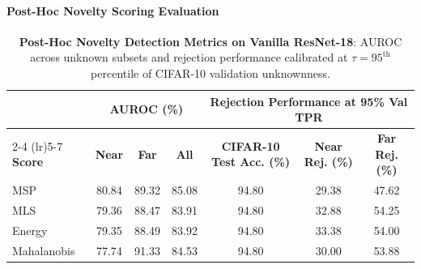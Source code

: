 \documentclass{article}
\begin{document}
\paragraph{Post-Hoc Novelty Scoring Evaluation}
\begin{table}[H]
    \centering
    \caption{\textbf{Post-Hoc Novelty Detection Metrics on Vanilla ResNet-18}: AUROC across unknown subsets and rejection performance calibrated at $\tau = 95^{\text{th}}$ percentile of CIFAR-10 validation unknownness.}
    \label{tab:task4_posthoc_scores}
    \begin{tabular}{lcccccc}
        \toprule
        & \multicolumn{3}{c}{\textbf{AUROC (\%)}} & \multicolumn{3}{c}{\textbf{Rejection Performance at 95\% Val TPR}} \\
        \cmidrule(lr){2-4} \cmidrule(lr){5-7}
        \textbf{Score} & \textbf{Near} & \textbf{Far} & \textbf{All} & \textbf{CIFAR-10 Test Acc. (\%)} & \textbf{Near Rej. (\%)} & \textbf{Far Rej. (\%)} \\
        \midrule
        MSP & 80.84 & 89.32 & 85.08 & 94.80 & 29.38 & 47.62 \\
        MLS & 79.36 & 88.47 & 83.91 & 94.80 & 32.88 & 54.25 \\
        Energy & 79.35 & 88.49 & 83.92 & 94.80 & 33.38 & 54.00 \\
        Mahalanobis & 77.74 & 91.33 & 84.53 & 94.80 & 30.00 & 53.88 \\
        \bottomrule
    \end{tabular}
\end{table}
\end{document}
